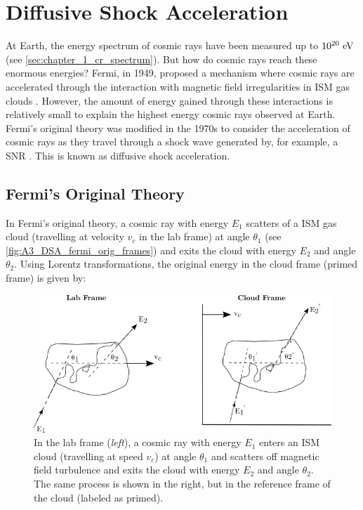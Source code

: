 \chapter{Diffusive Shock Acceleration} \label{A3_DSA}

At Earth, the energy spectrum of cosmic rays have been measured up to $10^{20}~\si{\electronvolt}$ (see \autoref{sec:chapter_1_cr_spectrum}). But how do cosmic rays reach these enormous energies? Fermi, in 1949, proposed a mechanism where cosmic rays are accelerated through the interaction with magnetic field irregularities in ISM gas clouds \citep{1949PhRv...75.1169F}. However, the amount of energy gained through these interactions is relatively small to explain the highest energy cosmic rays observed at Earth. Fermi's original theory was modified in the 1970s to consider the acceleration of cosmic rays as they travel through a shock wave generated by, for example, a SNR \citep{1977DoSSR.234.1306K,1977ICRC...11..132A,1978MNRAS.182..147B,1978MNRAS.182..443B,1978ApJ...221L..29B}. This is known as diffusive shock acceleration.

\section{Fermi's Original Theory}

In Fermi's original theory, a cosmic ray with energy $E_1$  scatters of a ISM gas cloud (travelling at velocity $v_c$ in the lab frame) at angle $\theta_1$ (see \autoref{fig:A3_DSA_fermi_orig_frames}) and exits the cloud with energy $E_2$ and angle $\theta_2$. Using Lorentz transformations, the original energy in the cloud frame (primed frame) is given by:

\begin{figure}[h!]
    \centering
    \includegraphics{A3_Diffusive_Shock_Acceleration/Images/fermi_original_theory_frames.png}
    \caption{In the lab frame (\textit{left}), a cosmic ray with energy $E_1$ enters an ISM cloud (travelling at speed $v_c$) at angle $\theta_1$ and scatters off magnetic field turbulence and exits the cloud with energy $E_2$ and angle $\theta_2$. The same process is shown in the right, but in the reference frame of the cloud (labeled as primed).}
    \label{fig:A3_DSA_fermi_orig_frames}
\end{figure}

